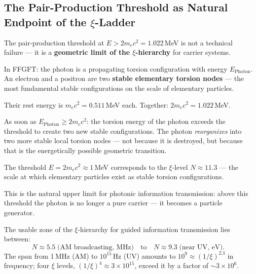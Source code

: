 \subsection{The Pair-Production Threshold as Natural
  Endpoint of the \texorpdfstring{$\xi$}{xi}-Ladder}
\label{sec:pair-production}

The pair-production threshold at $E > 2 m_e c^2 = 1.022$\,MeV
is not a technical failure ---
it is a \textbf{geometric limit of the $\xi$-hierarchy}
for carrier systems.

In FFGFT: the photon is a propagating
torsion configuration with energy $E_\text{Photon}$.
An electron and a positron are two
\textbf{stable elementary torsion nodes} ---
the most fundamental stable configurations
on the scale of elementary particles.

Their rest energy is $m_e c^2 = 0.511$\,MeV each.
Together: $2 m_e c^2 = 1.022$\,MeV.

As soon as $E_\text{Photon} \geq 2 m_e c^2$:
the torsion energy of the photon exceeds
the threshold to create two new stable configurations.
The photon \emph{reorganizes} into
two more stable local torsion nodes ---
not because it is destroyed,
but because that is the energetically possible
geometric transition.

\begin{keyresult}
The threshold $E = 2 m_e c^2 \approx 1$\,MeV
corresponds to the $\xi$-level $N \approx 11.3$ ---
the scale at which elementary particles exist as stable
torsion configurations.

This is the natural upper limit for photonic
information transmission:
above this threshold the photon is no longer
a pure carrier --- it becomes a particle generator.

The usable zone of the $\xi$-hierarchy for
guided information transmission lies between:
\begin{equation}
  N \approx 5.5 \;\text{(AM broadcasting, MHz)}
  \quad\text{to}\quad
  N \approx 9.3 \;\text{(near UV, eV)}.
\end{equation}
The span from 1\,MHz (AM) to $10^{15}$\,Hz (UV) amounts to
$10^9 \approx (1/\xi)^{2.3}$ in frequency; four $\xi$ levels,
$(1/\xi)^4 \approx 3 \times 10^{15}$, exceed it by a factor of
$\sim 3\times10^6$.
\end{keyresult}


